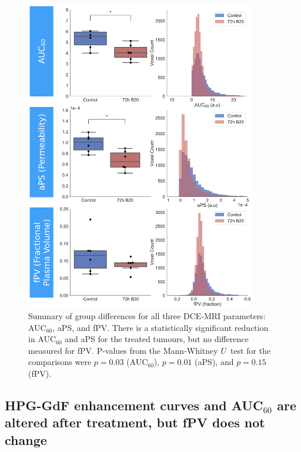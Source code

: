 \begin{figure}[htbp] %
  \centering
  \includegraphics[width=0.9\textwidth]{hpg/hpg-B20-images/hpg_mriparams.png} 
  \caption{Summary of group differences for all three \acs{DCE-MRI} parameters: \acs{AUC}$_{60}$, \acs{aPS}, and \acs{fPV}. 
  There is a statistically significant reduction in \acs{AUC}$_{60}$ and \acs{aPS} for the treated tumours, but no difference measured for \acs{fPV}.
  P-values from the Mann-Whitney $U$~test for the comparisons were $p=0.03$ (\acs{AUC}$_{60}$), $p=0.01$ (\acs{aPS}), and $p=0.15$ (\acs{fPV}).}
  \label{hpgB20:mriparams}
\end{figure}

\subsection{\texorpdfstring{\acs{HPG-GdF}}{HPG-GdF} enhancement curves and \texorpdfstring{\acs{AUC}$_{60}$}{AUC60} are altered after treatment, but \texorpdfstring{\acs{fPV}}{fPV} does not change}

